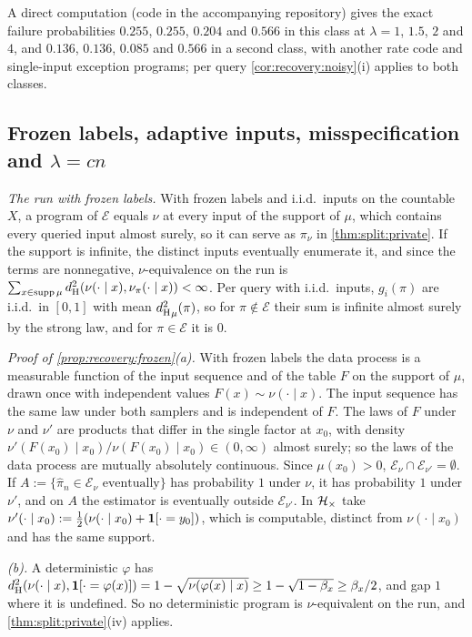 A direct computation (code in the accompanying repository) gives the exact failure probabilities $0.255$, $0.255$, $0.204$ and $0.566$ in this class at $\lambda=1$, $1.5$, $2$ and $4$, and $0.136$, $0.136$, $0.085$ and $0.566$ in a second class, with another rate code and single-input exception programs; per query \cref{cor:recovery:noisy}(i) applies to both classes.

\subsection{Frozen labels, adaptive inputs, misspecification and \texorpdfstring{$\lambda=cn$}{lambda=cn}}\label{app:recovery:beyond}

\emph{The run with frozen labels.} With frozen labels and i.i.d.\ inputs on the countable $X$, a program of $\mathcal E$ equals $\nu$ at every input of the support of $\mu$, which contains every queried input almost surely, so it can serve as $\pi_\nu$ in \cref{thm:split:private}. If the support is infinite, the distinct inputs eventually enumerate it, and since the terms are nonnegative, $\nu$-equivalence on the run is $\sum_{x\in\operatorname{supp}\mu}d_{\mathrm{H}}^{2}(\nu(\cdot\mid x),\nu_\pi(\cdot\mid x))<\infty$. Per query with i.i.d.\ inputs, $g_i(\pi)$ are i.i.d.\ in $[0,1]$ with mean ${d_{\mathrm{H}}^{2}}_\mu(\pi)$, so for $\pi\notin\mathcal E$ their sum is infinite almost surely by the strong law, and for $\pi\in\mathcal E$ it is $0$.

\emph{Proof of \cref{prop:recovery:frozen}(a).} With frozen labels the data process is a measurable function of the input sequence and of the table $F$ on the support of $\mu$, drawn once with independent values $F(x)\sim\nu(\cdot\mid x)$. The input sequence has the same law under both samplers and is independent of $F$. The laws of $F$ under $\nu$ and $\nu'$ are products that differ in the single factor at $x_0$, with density $\nu'(F(x_0)\mid x_0)/\nu(F(x_0)\mid x_0)\in(0,\infty)$ almost surely; so the laws of the data process are mutually absolutely continuous. Since $\mu(x_0)>0$, $\mathcal E_\nu\cap\mathcal E_{\nu'}=\emptyset$. If $A:=\{\hat\pi_n\in\mathcal E_\nu\text{ eventually}\}$ has probability $1$ under $\nu$, it has probability $1$ under $\nu'$, and on $A$ the estimator is eventually outside $\mathcal E_{\nu'}$. In $\mathcal{H}_{\times}$ take $\nu'(\cdot\mid x_0):=\frac12(\nu(\cdot\mid x_0)+\mathbf{1}[\cdot=y_0])$, which is computable, distinct from $\nu(\cdot\mid x_0)$ and has the same support.

\emph{(b).} A deterministic $\varphi$ has $d_{\mathrm{H}}^{2}(\nu(\cdot\mid x),\mathbf{1}[\cdot=\varphi(x)])=1-\sqrt{\nu(\varphi(x)\mid x)}\ge1-\sqrt{1-\beta_x}\ge\beta_x/2$, and gap $1$ where it is undefined. So no deterministic program is $\nu$-equivalent on the run, and \cref{thm:split:private}(iv) applies.

